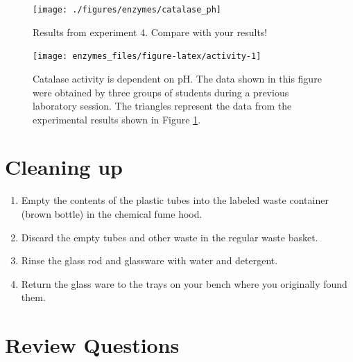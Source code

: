 \documentclass[]{book}
\providecommand{\tightlist}{%
  \setlength{\itemsep}{0pt}\setlength{\parskip}{0pt}}
\begin{document}
\begin{figure}

{\centering \texttt{[image: ./figures/enzymes/catalase\_ph]} 

}

\caption{Results from experiment 4. Compare with your results!}\label{fig:pH}
\end{figure}



\begin{figure}

{\centering \texttt{[image: enzymes\_files/figure-latex/activity-1]} 

}

\caption{Catalase activity is dependent on pH. The data shown in this figure were obtained by three groups of students during a previous laboratory session. The triangles represent the data from the experimental results shown in Figure \ref{fig:pH}.}\label{fig:activity}
\end{figure}

\hypertarget{cleaning-up-5}{%
\section{Cleaning up}\label{cleaning-up-5}}

\begin{enumerate}
\def\labelenumi{\arabic{enumi}.}
\tightlist
\item
  Empty the contents of the plastic tubes into the labeled waste container (brown bottle) in the chemical fume hood.
\item
  Discard the empty tubes and other waste in the regular waste basket.
\item
  Rinse the glass rod and glassware with water and detergent.
\item
  Return the glass ware to the trays on your bench where you originally found them.
\end{enumerate}

\hypertarget{review-questions-4}{%
\section{Review Questions}\label{review-questions-4}}
\end{document}
